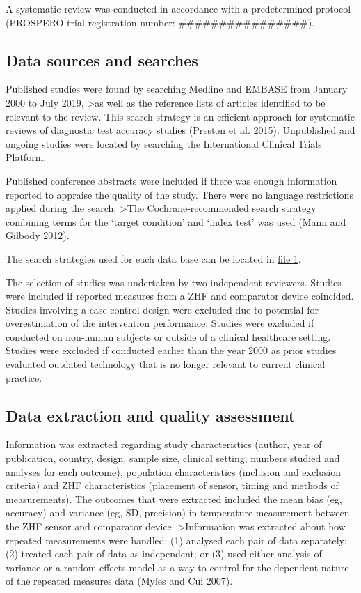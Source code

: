 \documentclass[smallextended]{svjour3}       %
\begin{document}
A systematic review was conducted in accordance with a predetermined
protocol (PROSPERO trial registration number:
\#\#\#\#\#\#\#\#\#\#\#\#\#\#\#\#).

\hypertarget{data-sources-and-searches}{%
\subsection{Data sources and searches}\label{data-sources-and-searches}}

Published studies were found by searching Medline and EMBASE from
January 2000 to July 2019, \textgreater{}as well as the reference lists
of articles identified to be relevant to the review. This search
strategy is an efficient approach for systematic reviews of diagnostic
test accuracy studies (Preston et al. 2015). Unpublished and ongoing
studies were located by searching the International Clinical Trials
Platform.

Published conference abstracts were included if there was enough
information reported to appraise the quality of the study. There were no
language restrictions applied during the search. \textgreater{}The
Cochrane-recommended search strategy combining terms for the `target
condition' and `index test' was used (Mann and Gilbody 2012).

The search strategies used for each data base can be located in
\href{}{file 1}.

The selection of studies was undertaken by two independent reviewers.
Studies were included if reported measures from a ZHF and comparator
device coincided. Studies involving a case control design were excluded
due to potential for overestimation of the intervention performance.
Studies were excluded if conducted on non-human subjects or outside of a
clinical healthcare setting. Studies were excluded if conducted earlier
than the year 2000 as prior studies evaluated outdated technology that
is no longer relevant to current clinical practice.

\hypertarget{data-extraction-and-quality-assessment}{%
\subsection{Data extraction and quality
assessment}\label{data-extraction-and-quality-assessment}}

Information was extracted regarding study characteristics (author, year
of publication, country, design, sample size, clinical setting, numbers
studied and analyses for each outcome), population characteristics
(inclusion and exclusion criteria) and ZHF characteristics (placement of
sensor, timing and methods of measurements). The outcomes that were
extracted included the mean bias (eg, accuracy) and variance (eg, SD,
precision) in temperature measurement between the ZHF sensor and
comparator device. \textgreater{}Information was extracted about how
repeated measurements were handled: (1) analysed each pair of data
separately; (2) treated each pair of data as independent; or (3) used
either analysis of variance or a random effects model as a way to
control for the dependent nature of the repeated measures data (Myles
and Cui 2007).
\end{document}
